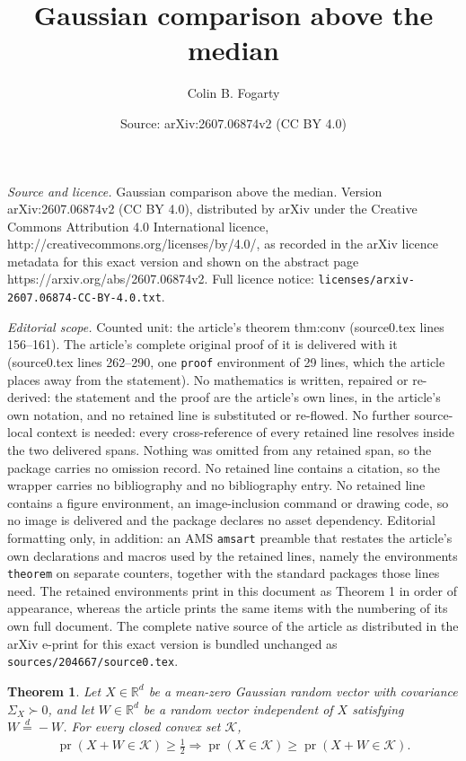 \documentclass[10pt,a4paper]{amsart}
\title{Gaussian comparison above the median}
\author{Colin B. Fogarty}
\date{Source: arXiv:2607.06874v2 (CC BY 4.0)}
\newtheorem{theorem}{Theorem}
\def\pr{{\operatorname{pr}}}
\begin{document}
\maketitle

\noindent\emph{Source and licence.} Gaussian comparison above the median. Version arXiv:2607.06874v2 (CC BY 4.0), distributed by arXiv under the Creative Commons Attribution 4.0 International licence, http://creativecommons.org/licenses/by/4.0/, as recorded in the arXiv licence metadata for this exact version and shown on the abstract page https://arxiv.org/abs/2607.06874v2. Full licence notice: \texttt{licenses/arxiv-2607.06874-CC-BY-4.0.txt}.\par\smallskip

\noindent\textit{Editorial scope.} Counted unit: the article's theorem thm:conv (source0.tex lines 156--161). The article's complete original proof of it is delivered with it (source0.tex lines 262--290, one \texttt{proof} environment of 29 lines, which the article places away from the statement). No mathematics is written, repaired or re-derived: the statement and the proof are the article's own lines, in the article's own notation, and no retained line is substituted or re-flowed.  No further source-local context is needed: every cross-reference of every retained line resolves inside the two delivered spans.  Nothing was omitted from any retained span, so the package carries no omission record.  No retained line contains a citation, so the wrapper carries no bibliography and no bibliography entry.  No retained line contains a figure environment, an image-inclusion command or drawing code, so no image is delivered and the package declares no asset dependency.  Editorial formatting only, in addition: an AMS \texttt{amsart} preamble that restates the article's own declarations and macros used by the retained lines, namely the environments \texttt{theorem} on separate counters, together with the standard packages those lines need.  The retained environments print in this document as Theorem 1 in order of appearance, whereas the article prints the same items with the numbering of its own full document.  The complete native source of the article as distributed in the arXiv e-print for this exact version is bundled unchanged as \texttt{sources/204667/source0.tex}.
\begin{theorem}\label{thm:conv}
Let $X\in \mathbb{R}^d$ be a mean-zero Gaussian random vector with covariance $\Sigma_X\succ 0$, and let $W \in \mathbb{R}^d$ be a random vector independent of $X$ satisfying $W \overset{d}{=}-W$. For every closed convex set $\mathcal{K}$,
\begin{align*}
\pr(X+W \in \mathcal{K})\geq \frac{1}{2} \Rightarrow \pr(X \in \mathcal{K})\geq \pr(X+W\in \mathcal{K}).
\end{align*}
\end{theorem}
\end{document}
